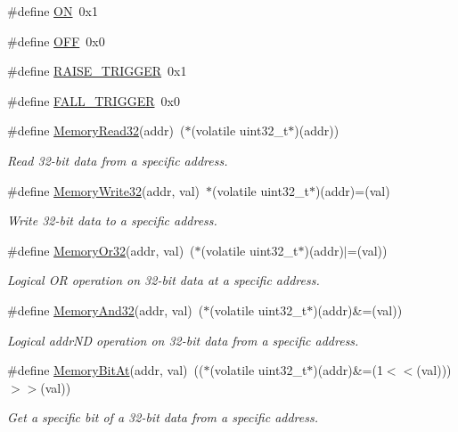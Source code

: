 \begin{DoxyCompactItemize}
\item 
\#define \mbox{\hyperlink{a00020_ad76d1750a6cdeebd506bfcd6752554d2}{ON}}~0x1
\item 
\#define \mbox{\hyperlink{a00020_a29e413f6725b2ba32d165ffaa35b01e5}{O\+FF}}~0x0
\item 
\#define \mbox{\hyperlink{a00020_abda90eda34a640b130f48a6ade23fe22}{R\+A\+I\+S\+E\+\_\+\+T\+R\+I\+G\+G\+ER}}~0x1
\item 
\#define \mbox{\hyperlink{a00020_a9bbaf5b9e2125c7597249c7113b20e6c}{F\+A\+L\+L\+\_\+\+T\+R\+I\+G\+G\+ER}}~0x0
\item 
\#define \mbox{\hyperlink{a00020_a2d484dc15bdf30ee11ab3b05f31f0e16}{Memory\+Read32}}(addr)~($\ast$(volatile uint32\+\_\+t$\ast$)(addr))
\begin{DoxyCompactList}\small\item\em Read 32-\/bit data from a specific address. \end{DoxyCompactList}\item 
\#define \mbox{\hyperlink{a00020_a6b9732365b12e48ddb89fe1028b975b0}{Memory\+Write32}}(addr,  val)~$\ast$(volatile uint32\+\_\+t$\ast$)(addr)=(val)
\begin{DoxyCompactList}\small\item\em Write 32-\/bit data to a specific address. \end{DoxyCompactList}\item 
\#define \mbox{\hyperlink{a00020_a27874a97deab7cecdde5ddecf466e31e}{Memory\+Or32}}(addr,  val)~($\ast$(volatile uint32\+\_\+t$\ast$)(addr)$\vert$=(val))
\begin{DoxyCompactList}\small\item\em Logical OR operation on 32-\/bit data at a specific address. \end{DoxyCompactList}\item 
\#define \mbox{\hyperlink{a00020_ad87cedffcaadc51db22594fce55173d4}{Memory\+And32}}(addr,  val)~($\ast$(volatile uint32\+\_\+t$\ast$)(addr)\&=(val))
\begin{DoxyCompactList}\small\item\em Logical addr\+ND operation on 32-\/bit data from a specific address. \end{DoxyCompactList}\item 
\#define \mbox{\hyperlink{a00020_afc530c7e6b49b0ca97c1ad9dac1c4750}{Memory\+Bit\+At}}(addr,  val)~(($\ast$(volatile uint32\+\_\+t$\ast$)(addr)\&=(1$<$$<$(val)))$>$$>$(val))
\begin{DoxyCompactList}\small\item\em Get a specific bit of a 32-\/bit data from a specific address. \end{DoxyCompactList}\item 

\end{DoxyCompactItemize}
